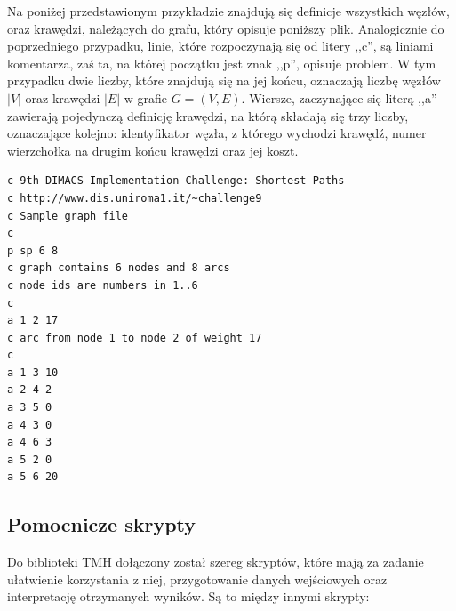 Na poniżej przedstawionym przykładzie znajdują się definicje wszystkich węzłów, oraz krawędzi, należących do grafu, który opisuje poniższy plik. Analogicznie do poprzedniego przypadku, linie, które rozpoczynają się od litery ,,c'', są liniami komentarza, zaś ta, na której początku jest znak ,,p'', opisuje problem. W tym przypadku dwie liczby, które znajdują się na jej końcu, oznaczają liczbę węzłów $\left| V \right|$ oraz krawędzi $\left| E \right|$ w grafie $G = \left( V, E \right)$. Wiersze, zaczynające się literą ,,a'' zawierają pojedynczą definicję krawędzi, na którą składają się trzy liczby, oznaczające kolejno: identyfikator węzła, z którego wychodzi krawędź, numer wierzchołka na drugim końcu krawędzi oraz jej koszt.

\small
\begin{lstlisting}[language=bash]
c 9th DIMACS Implementation Challenge: Shortest Paths
c http://www.dis.uniroma1.it/~challenge9
c Sample graph file
c
p sp 6 8
c graph contains 6 nodes and 8 arcs
c node ids are numbers in 1..6
c
a 1 2 17
c arc from node 1 to node 2 of weight 17
c
a 1 3 10
a 2 4 2
a 3 5 0
a 4 3 0
a 4 6 3
a 5 2 0
a 5 6 20

\end{lstlisting}
\normalsize

\subsection{Pomocnicze skrypty}

Do biblioteki \textsc{TMH} dołączony został szereg skryptów, które mają za zadanie ułatwienie korzystania z niej, przygotowanie danych wejściowych oraz interpretację otrzymanych wyników. Są to między innymi skrypty:

\newpage

